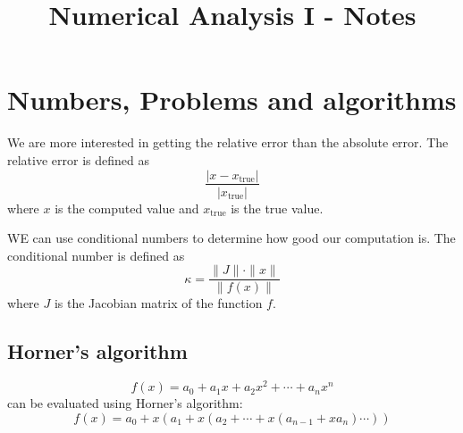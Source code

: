 \documentclass[11pt]{article}
\title{Numerical Analysis I - Notes}
\author{}
\date{}
\begin{document}
\maketitle

\section{Numbers, Problems and algorithms}
 We are more interested in getting the relative error than the absolute error. The relative error is defined as
\[  
\frac{|x - x_{\text{true}}|}{|x_{\text{true}}|}
\]
where $x$ is the computed value and $x_{\text{true}}$ is the true value.

WE can use conditional numbers to determine how good our computation is. The conditional number is defined as
\[
\kappa = \frac{\|J\| \cdot \|x\|}{\|f(x)\|}
\]
where $J$ is the Jacobian matrix of the function $f$.

\subsection{Horner's algorithm}


\[
f(x) = a_0 + a_1 x + a_2 x^2 + \cdots + a_n x^n
\]
can be evaluated using Horner's algorithm:
\[
f(x) = a_0 + x(a_1 + x(a_2 + \cdots + x(a_{n-1} + x a_n) \cdots))
\]
\end{document}

